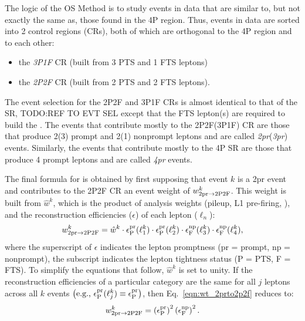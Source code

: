 The logic of the OS Method is to study events in data that are similar to, but not exactly the same as, those found in the 4P region.
Thus, events in data are sorted into 2 control regions (CRs), both of which are orthogonal to the 4P region and to each other:
\begin{itemize}
	\item the \emph{3P1F} CR (built from 3 PTS and 1 FTS leptons)
	\item the \emph{2P2F} CR (built from 2 PTS and 2 FTS leptons).
\end{itemize}
The event selection for the 2P2F and 3P1F CRs is almost identical to that of the SR, TODO:REF TO EVT SEL %
except that the FTS lepton(s) are required to build the \Ztwo.
The events that contribute mostly to the 2P2F(3P1F) CR are those that produce 2(3) prompt and 2(1) nonprompt leptons and are called \emph{2pr}(\emph{3pr}) events.
Similarly, the events that contribute mostly to the 4P SR are those that produce 4 prompt leptons and are called \emph{4pr} events.

The final formula for \nfourPRB is obtained by first supposing that event $k$ is a 2pr event and contributes to the 2P2F CR an event weight of $w_{\text{2pr} \to \text{2P2F}}^k$.
This weight is built from $\hat{w}^k$, which is the product of analysis weights (pileup, L1 pre-firing, \etc), and the reconstruction efficiencies ($\epsilon$) of each lepton ($\ell_n$):
\begin{equation}
	\label{eqn:wt_2prto2p2f}
	w_{\text{2pr} \to \text{2P2F}}^k = \hat{w}^k \cdot \epsilon^\text{pr}_\text{P}(\ell_1^k) \cdot \epsilon^\text{pr}_\text{P}(\ell_2^k) \cdot \epsilon^\text{np}_\text{F}(\ell_3^k) \cdot \epsilon^\text{np}_\text{F}(\ell_4^k),
\end{equation}
where the superscript of $\epsilon$ indicates the lepton promptness (pr = prompt, np = nonprompt),
the subscript indicates the lepton tightness status (P = PTS, F = FTS).
To simplify the equations that follow, $\hat{w}^k$ is set to unity.
If the reconstruction efficiencies of a particular category are the same for all $j$ leptons across all $k$ events $\left( \mbox{e.g.,} ~ \epsilon^\text{pr}_\text{P}(\ell_j^k) \equiv \epsilon^\text{pr}_\text{P} \right)$, then Eq.~\ref{eqn:wt_2prto2p2f} reduces to:
\begin{equation}
	\label{eqn:wt_2prto2p2f_simp}
	w_{\text{2pr} \to \text{2P2F}}^k = 
	\left( \epsilon^\text{pr}_\text{P} \right)^2 
	\left( \epsilon^\text{np}_\text{F} \right)^2.
\end{equation}

